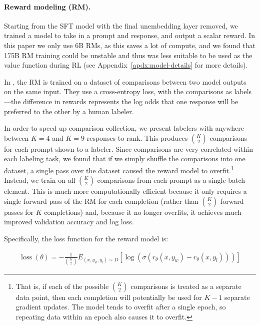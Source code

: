 \documentclass{article}
\begin{document}
\paragraph{Reward modeling (RM).} Starting from the SFT model with the final unembedding layer
removed, we trained a model to take in a prompt and response, and output
a scalar reward. In this paper we only use 6B RMs, as this saves a lot of compute, and we found that 175B RM training could be unstable and thus was less suitable to be used as the value function during RL (see Appendix~\ref{apdx:model-details} for more details). 

In \citet{stiennon2020learning}, the RM is trained on a dataset of comparisons between two model outputs on the same input. They use a cross-entropy loss, with the comparisons as labels---the difference in rewards represents the log odds that one response will be preferred to the other by a human labeler.  

In order to speed up comparison collection, we present labelers with anywhere between $K=4$ and $K=9$ responses to rank.  This produces ${K \choose 2}$ comparisons for each prompt shown to a labeler.  Since comparisons are very correlated within each labeling task, we found that if we simply shuffle the comparisons into one dataset, a single pass over the dataset caused the reward model to overfit.\footnote{That is, if each of the possible ${K \choose 2}$ comparisons is treated as a separate data point, then each completion will potentially be used for $K-1$ separate gradient updates. The model tends to overfit after a single epoch, so repeating data within an epoch also causes it to overfit.}
Instead, we train on all ${K \choose 2}$ comparisons from each prompt as a single batch element.  This is much more computationally efficient because it only requires a single forward pass of the RM for each completion (rather than ${K \choose 2}$ forward passes for $K$ completions) and, because it no longer overfits, it achieves much improved validation accuracy and log loss.

Specifically, the loss function for the reward model is:

\begin{equation} \label{eq1}
\begin{split}
\operatorname{loss}\left(\theta \right)=-\frac{1}{{K \choose 2}}E_{\left(x, y_{w}, y_{l}\right) \sim D}\left[\log \left(\sigma\left(r_{\theta}\left(x, y_{w}\right)-r_{\theta}\left(x, y_{l}\right)\right)\right)\right]
\end{split}
\end{equation}
\end{document}
